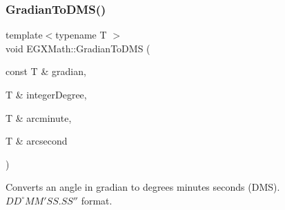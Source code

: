 \subsubsection{\texorpdfstring{Gradian\+To\+D\+M\+S()}{GradianToDMS()}}
{\footnotesize\ttfamily template$<$typename T $>$ \\
void E\+G\+X\+Math\+::\+Gradian\+To\+D\+MS (\begin{DoxyParamCaption}\item[{const T \&}]{gradian,  }\item[{T \&}]{integer\+Degree,  }\item[{T \&}]{arcminute,  }\item[{T \&}]{arcsecond }\end{DoxyParamCaption})}



Converts an angle in gradian to degrees minutes seconds (D\+MS). ${DD}^{\circ}{MM}'{SS.SS}''$ format. 

